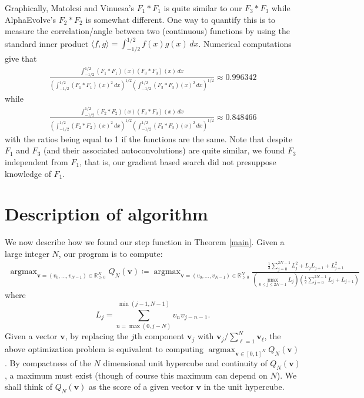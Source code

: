 \documentclass[reqno, 11pt]{amsart}
\newcommand{\R}[0]{\mathbb{R}}
\newcommand{\mb}[1]{\mathbf{#1}}
\DeclareMathOperator*{\argmax}{argmax}
\theoremstyle{remark}
\begin{document}
Graphically, Matolcsi and Vinuesa's $F_1 \ast F_1$ is quite similar to our $F_3 \ast F_3$
while AlphaEvolve's $F_2 \ast F_2$ is somewhat different. One way to quantify this
is to measure the correlation/angle between two (continuous) functions by using the standard inner product
$\langle f, g \rangle = \int_{-1/2}^{1/2}f(x)g(x)\, dx$. 
Numerical computations give that
\begin{align*}
\frac{\int_{-1/2}^{1/2}(F_{1} \ast F_1)(x)(F_3 \ast F_3)(x)\, dx}{(\int_{-1/2}^{1/2}(F_{1} \ast F_1)(x)^{2}\, dx)^{1/2}(\int_{-1/2}^{1/2}(F_{3} \ast F_{3})(x)^{2}\, dx)^{1/2}} \approx 0.996342
\end{align*}
while
\begin{align*}
\frac{\int_{-1/2}^{1/2}(F_{2} \ast F_2)(x)(F_3 \ast F_3)(x)\, dx}{(\int_{-1/2}^{1/2}(F_{2} \ast F_2)(x)^{2}\, dx)^{1/2}(\int_{-1/2}^{1/2}(F_{3} \ast F_{3})(x)^{2}\, dx)^{1/2}} \approx 0.848466
\end{align*}
with the ratios being equal to 1 if the functions are the same.
Note that despite $F_1$ and $F_3$ (and their associated autoconvolutions) are quite similar,
we found $F_3$ independent from $F_1$, that is, our gradient based search did not presuppose knowledge of $F_1$.




\section{Description of algorithm}\label{desc}
We now describe how we found our step function in Theorem \ref{main}.
Given a large integer $N$, our program is to compute:
\begin{align*}
\argmax_{\mb{v} = (v_0, \ldots, v_{N - 1}) \in \R^{N}_{\geq 0}}Q_{N}(\mb{v}) \coloneqq \argmax_{\mb{v} = (v_0, \ldots, v_{N - 1}) \in \R^{N}_{\geq 0}}\frac{\frac{1}{3}\sum_{j = 0}^{2N - 1}L_{j}^{2} + L_{j}L_{j + 1} + L_{j + 1}^{2}}{(\max_{0 \leq j \leq 2N - 1}L_j)(\frac{1}{2}\sum_{j = 0}^{2N - 1}L_{j} + L_{j + 1})}
\end{align*}
where
$$L_j = \sum_{n = \max(0, j - N)}^{\min(j - 1, N - 1)}v_{n}v_{j - n - 1}.$$
Given a vector $\mb{v}$, by replacing the $j$th component
$\mb{v}_j$ with $\mb{v}_{j}/\sum_{\ell = 1}^{N}\mb{v}_\ell$, the above
optimization problem is equivalent to computing
$\argmax_{\mb{v} \in [0, 1]^{N}}Q_{N}(\mb{v})$.
By compactness of the $N$ dimensional unit hypercube and continuity
of $Q_{N}(\mb{v})$, a maximum must exist (though of course
this maximum can depend on $N$). We shall think
of $Q_{N}(\mb{v})$ as the score of a given vector $\mb{v}$ in the unit hypercube.
\end{document}
